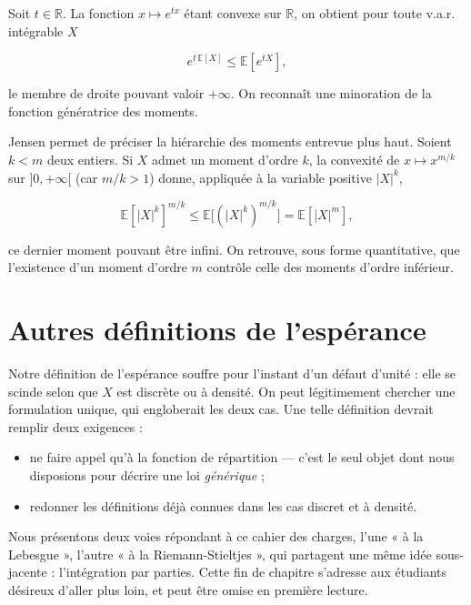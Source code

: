 \begin{exemple}
Soit $t \in \mathbb{R}$. La fonction $x \mapsto e^{tx}$ étant convexe sur $\mathbb{R}$, on obtient pour toute v.a.r. intégrable $X$

$$
e^{t\, \mathbb{E}[X]} \leq \mathbb{E}[e^{tX}],
$$

le membre de droite pouvant valoir $+\infty$. On reconnaît une minoration de la fonction génératrice des moments.
\end{exemple}

\begin{exemple}
Jensen permet de préciser la hiérarchie des moments entrevue plus haut. Soient $k < m$ deux entiers. Si $X$ admet un moment d'ordre $k$, la convexité de $x \mapsto x^{m/k}$ sur $]0, +\infty[$ (car $m/k > 1$) donne, appliquée à la variable positive $|X|^k$,

$$
\mathbb{E}[|X|^k]^{m/k} \leq \mathbb{E}\big[(|X|^k)^{m/k}\big] = \mathbb{E}[|X|^m],
$$

ce dernier moment pouvant être infini. On retrouve, sous forme quantitative, que l'existence d'un moment d'ordre $m$ contrôle celle des moments d'ordre inférieur.
\end{exemple}

\section{Autres définitions de l'espérance}

Notre définition de l'espérance souffre pour l'instant d'un défaut d'unité : elle se scinde selon que $X$ est discrète ou à densité. On peut légitimement chercher une formulation unique, qui engloberait les deux cas. Une telle définition devrait remplir deux exigences :

\begin{itemize}
\item ne faire appel qu'à la fonction de répartition — c'est le seul objet dont nous disposions pour décrire une loi \emph{générique} ;
\item redonner les définitions déjà connues dans les cas discret et à densité.
\end{itemize}

Nous présentons deux voies répondant à ce cahier des charges, l'une « à la Lebesgue », l'autre « à la Riemann-Stieltjes », qui partagent une même idée sous-jacente : l'intégration par parties. Cette fin de chapitre s'adresse aux étudiants désireux d'aller plus loin, et peut être omise en première lecture.

